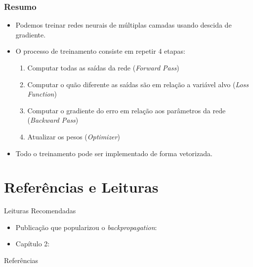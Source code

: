 \documentclass[aspectratio=169, xcolor=dvipsnames]{beamer}
\begin{document}
  \begin{frame}
    \frametitle{Resumo}
    \begin{itemize}
      \item Podemos treinar redes neurais de múltiplas camadas usando descida de
        gradiente.
        \vfill

      \item O processo de treinamento consiste em repetir 4 etapas:
        \begin{enumerate}
          \item Computar todas as saídas da rede (\textit{Forward Pass})

          \item Computar o quão diferente as saídas são em relação a variável alvo (\textit{Loss Function})

          \item Computar o gradiente do erro em relação aos parâmetros da rede (\textit{Backward Pass})

          \item Atualizar os pesos (\textit{Optimizer})
        \end{enumerate}
        \vfill

      \item Todo o treinamento pode ser implementado de forma vetorizada.
    \end{itemize}
  \end{frame}

  \section*{Referências e Leituras}
  \begin{frame}{Leituras Recomendadas}
    \leiturasize
    \begin{itemize}
      \item Publicação que popularizou o \textit{backpropagation}: 

      \item Capítulo 2: 
    \end{itemize}
  \end{frame}


  \begin{frame}{Referências}
    \printbibliography
  \end{frame}
\end{document}
